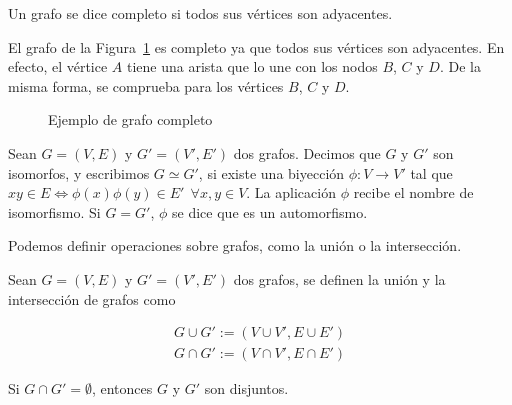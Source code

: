\begin{defi}
	Un grafo se dice completo si todos sus vértices son adyacentes.
\end{defi}

\begin{ejemplo}
	El grafo de la Figura~\ref{fig:grafo_completo} es completo ya que todos sus vértices son adyacentes. En efecto, el vértice $A$ tiene una arista que lo une con los nodos $B$, $C$ y $D$. De la misma forma, se comprueba para los vértices $B$, $C$ y $D$.
	
	\begin{figure}[htb]
		\centering
		\ejemplografocompleto
		\caption{Ejemplo de grafo completo}
		\label{fig:grafo_completo}
	\end{figure}
	
\end{ejemplo}

\begin{defi}
	Sean $G = (V,E)$ y $G' = (V',E')$ dos grafos. Decimos que $G$ y $G'$ son isomorfos, y escribimos $G \simeq G'$, si existe una biyección $\phi : V \to V'$ tal que $xy \in E \iff \phi(x)\phi(y) \in E' \ \ \forall x,y \in V$. La aplicación $\phi$ recibe el nombre de isomorfismo. Si $G = G'$, $\phi$ se dice que es un automorfismo. 
\end{defi}

Podemos definir operaciones sobre grafos, como la unión o la intersección.

\begin{defi}
	Sean $G = (V,E)$ y $G' = (V',E')$ dos grafos, se definen la unión y la intersección de grafos como
	
	\begin{eqnarray*}
		G \cup G' := (V \cup V', E \cup E')\\
		G \cap G' := (V \cap V', E \cap E')
	\end{eqnarray*}
	
	Si $G \cap G' = \emptyset$, entonces $G$ y $G'$ son disjuntos.
\end{defi}

